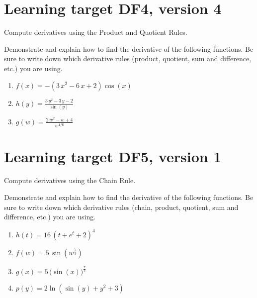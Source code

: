 \pagebreak

\section{Learning target DF4, version 4}

Compute derivatives using the Product and Quotient Rules.

\hrulefill

Demonstrate and explain how to find the derivative of the following functions. Be sure to write down which derivative rules (product, quotient, sum and difference, etc.) you are using.

\begin{enumerate}
    \item \(\renewcommand{\log}{\ln} f(x)= -{\left(3 \, x^{2} - 6 \, x + 2\right)} \cos\left(x\right)\)
    \vfill
    \item \(\renewcommand{\log}{\ln} h(y)= \frac{3 \, y^{2} - 3 \, y - 2}{\sin\left(y\right)}\)
    \vfill
    \item \(\renewcommand{\log}{\ln} g(w)= \frac{2 \, w^{2} - w + 4}{w^{1/6}}\)
    \vfill
\end{enumerate}

\pagebreak

\section{Learning target DF5, version 1}

Compute derivatives using the Chain Rule.

\hrulefill

Demonstrate and explain how to find the derivative of the following functions. Be sure to write down which derivative rules (chain, product, quotient, sum and difference, etc.) you are using.

\begin{enumerate}
    \item \(h(t)= 16 \, {\left(t + e^{t} + 2\right)}^{4}\)
    \vfill
    \item \(f(w)= 5 \, \sin\left(w^{\frac{7}{3}}\right)\)
    \vfill
    \item \(g(x)= 5 \, \Big(\sin\left(x\right)\Big)^{\frac{7}{3}}\)
    \vfill
    \item \(p(y) = 2\ln\left(\sin(y) + y^2 + 3\right)\)
    \vfill
\end{enumerate}



